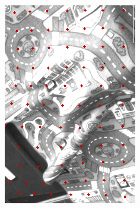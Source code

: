 {\begin{columns}
\begin{figure}[h!]
\begin{subfigure}{0.3\linewidth}
      \includegraphics[height=1.5\textwidth]{figures/pixels2_strip.png}
    \end{subfigure}
    \begin{subfigure}{0.3\linewidth}

\end{subfigure}
\end{figure}
\end{columns}}
